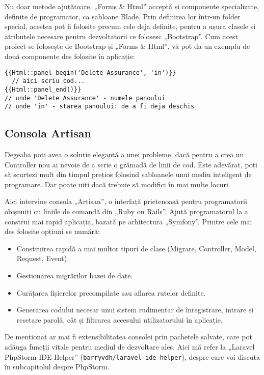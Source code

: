 		Nu doar metode ajutătoare, „Forms \& Html” acceptă și componente specializate, definite de programator, ca șabloane Blade.
		Prin definirea lor într-un folder special, acestea pot fi folosite precum cele deja definite, pentru a ușura clasele și atributele necesare pentru dezvoltatorii ce folosesc „Bootstrap”.
		Cum acest proiect se folosește de Bootstrap și „Forms \& Html”, vă pot da un exemplu de două componente des folosite în aplicație:
		\begin{Verbatim}
{{Html::panel_begin('Delete Assurance', 'in')}}
  // aici scriu cod...
{{Html::panel_end()}}
// unde 'Delete Assurance' - numele panoului
// unde 'in' - starea panoului: de a fi deja deschis
		\end{Verbatim}

	\subsection{Consola Artisan}


		Degeaba poți avea o soluție elegantă a unei probleme, dacă pentru a crea un Controller nou ai nevoie de a scrie o grămadă de linii de cod.
		Este adevărat, poți să scurtezi mult din timpul prețios folosind șabloanele unui mediu inteligent de programare.
		Dar poate uiți dacă trebuie să modifici în mai multe locuri.

		Aici intervine consola „Artisan”, o interfață prietenoasă pentru programatorii obișnuiți cu liniile de comandă din „Ruby on Rails”.
		Ajută programatorul la a construi mai rapid aplicația, bazată pe arhitectura „Symfony”.
		Printre cele mai des folosite opțiuni se numără:
		\begin{itemize}
			\item Construirea rapidă a mai multor tipuri de clase (Migrare, Controller, Model, Request, Event).
			\item Gestionarea migrărilor bazei de date.
			\item Curățarea fișierelor precompilate sau aflarea rutelor definite.
			\item Generarea codului necesar unui sistem rudimentar de înregistrare, intrare și resetare parolă, cât și filtrarea accesului utilizatorului în aplicație.
		\end{itemize}
		De menționat ar mai fi extensibilitatea consolei prin pachetele salvate, care pot adăuga funcții vitale pentru mediul de dezvoltare ales.
		Aici mă refer la „Laravel PhpStorm IDE Helper” (\verb|barryvdh/laravel-ide-helper|), despre care voi discuta în subcapitolul despre PhpStorm.
